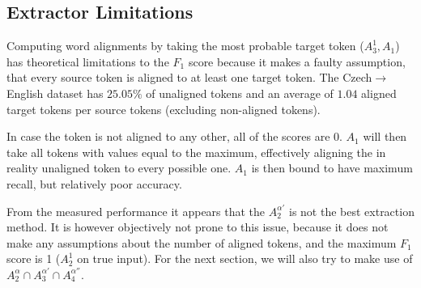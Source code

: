 \subsection{Extractor Limitations}

Computing word alignments by taking the most probable target token ($A_3^1, A_1$) has theoretical limitations to the $F_1$ score because it makes a faulty assumption, that every source token is aligned to at least one target token. The Czech$\rightarrow$English dataset has $25.05\%$ of unaligned tokens and an average of $1.04$ aligned target tokens per source tokens (excluding non-aligned tokens). 

In case the token is not aligned to any other, all of the scores are $0$. $A_1$ will then take all tokens with values equal to the maximum, effectively aligning the in reality unaligned token to every possible one. $A_1$ is then bound to have maximum recall, but relatively poor accuracy.

From the measured performance it appears that the $A_2^{\alpha'}$ is not the best extraction method. It is however objectively not prone to this issue, because it does not make any assumptions about the number of aligned tokens, and the maximum $F_1$ score is 1 ($A_2^1$ on true input). For the next section, we will also try to make use of $A_2^{\alpha} \cap A_3^{\alpha'} \cap A_4^{\alpha''}$.